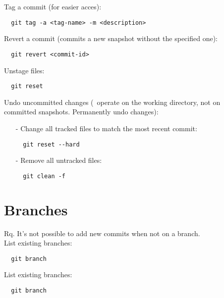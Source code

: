 \documentclass[french]{article}
\begin{document}
Tag a commit (for easier acces):
\begin{verbatim}
  git tag -a <tag-name> -m <description>
\end{verbatim}

Revert a commit (commits a new snapshot without the specified one):
\begin{verbatim}
  git revert <commit-id>
\end{verbatim}

Unstage files:
\begin{verbatim}
  git reset
\end{verbatim}

Undo uncommitted changes (\danger\ operate on the working directory, not on committed snapshots. Permanently undo changes):
\begin{itemize}
\item [-] Change all tracked files to match the most recent commit:
\begin{verbatim}
  git reset --hard
\end{verbatim}
\item [-] Remove all untracked files:
\begin{verbatim}
  git clean -f
\end{verbatim}
\end{itemize}

\section{Branches}

Rq. It's not possible to add new commits when not on a branch.\\

List existing branches:
\begin{verbatim}
  git branch
\end{verbatim}

List existing branches:
\begin{verbatim}
  git branch
\end{verbatim}
\end{document}
